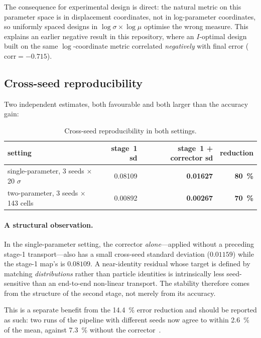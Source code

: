 ﻿\documentclass[11pt,a4paper]{article}
\newcommand{\strong}{\textcolor{green!35!black}{\textbullet\!\textbullet\!\textbullet}}
\begin{document}
The consequence for experimental design is direct: the natural metric on this parameter space is
in displacement coordinates, not in log-parameter coordinates, so uniformly spaced designs in
$\log\sigma\times\log\mu$ optimise the wrong measure. This explains an earlier negative result
in this repository, where an $I$-optimal design built on the same $\log$-coordinate metric
correlated \emph{negatively} with final error ($\mathrm{corr}=-0.715$).

\subsection{Cross-seed reproducibility}
\label{sec:repro}

Two independent estimates, both favourable and both larger than the accuracy gain:

\begin{table}[h]
\centering\small
\begin{tabular}{@{}lrrr@{}}
\toprule
setting & stage~1 sd & stage~1 + corrector sd & reduction \\
\midrule
single-parameter, 3 seeds $\times$ 20 $\sigma$ & 0.08109 & \textbf{0.01627} &
  \textbf{\SI{80}{\percent}} \\
two-parameter, 3 seeds $\times$ 143 cells & 0.00892 & \textbf{0.00267} &
  \textbf{\SI{70}{\percent}} \\
\bottomrule
\end{tabular}
\caption{Cross-seed reproducibility in both settings.}
\end{table}

\paragraph{A structural observation.} In the single-parameter setting, the corrector
\emph{alone}---applied without a preceding stage-1 transport---also has a small cross-seed
standard deviation ($0.01159$) while the stage-1 map's is $0.08109$. A near-identity residual
whose target is defined by matching \emph{distributions} rather than particle identities is
intrinsically less seed-sensitive than an end-to-end non-linear transport. The stability
therefore comes from the structure of the second stage, not merely from its accuracy.

This is a separate benefit from the \SI{14.4}{\percent} error reduction and should be reported
as such: two runs of the pipeline with different seeds now agree to within \SI{2.6}{\percent} of
the mean, against \SI{7.3}{\percent} without the corrector~\strong.
\end{document}
